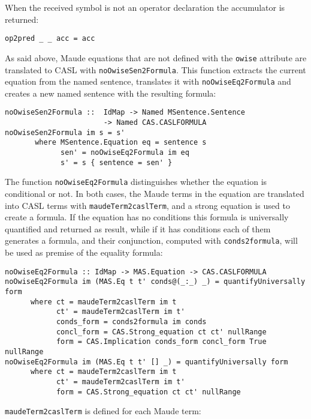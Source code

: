 When the received symbol is not an operator declaration the accumulator
is returned:

{\codesize
\begin{verbatim}
op2pred _ _ acc = acc
\end{verbatim}
}

As said above, Maude equations that are not defined with the \verb"owise"
attribute are translated to CASL with \verb"noOwiseSen2Formula". This
function extracts the current equation from the named sentence, translates
it with \verb"noOwiseEq2Formula" and creates a new named sentence
with the resulting formula:

{\codesize
\begin{verbatim}
noOwiseSen2Formula ::  IdMap -> Named MSentence.Sentence
                       -> Named CAS.CASLFORMULA
noOwiseSen2Formula im s = s'
       where MSentence.Equation eq = sentence s
             sen' = noOwiseEq2Formula im eq
             s' = s { sentence = sen' }
\end{verbatim}
}

The function \verb"noOwiseEq2Formula" distinguishes whether the equation
is conditional or not. In both cases, the Maude terms in the equation
are translated into CASL terms with \verb"maudeTerm2caslTerm", and a
strong equation is used to create a formula. If the equation has no
conditions this formula is universally quantified and returned as result,
while if it has conditions each of them generates a formula, and their
conjunction, computed with \verb"conds2formula", will be used as premise
of the equality formula:

{\codesize
\begin{verbatim}
noOwiseEq2Formula :: IdMap -> MAS.Equation -> CAS.CASLFORMULA
noOwiseEq2Formula im (MAS.Eq t t' conds@(_:_) _) = quantifyUniversally form
      where ct = maudeTerm2caslTerm im t
            ct' = maudeTerm2caslTerm im t'
            conds_form = conds2formula im conds
            concl_form = CAS.Strong_equation ct ct' nullRange
            form = CAS.Implication conds_form concl_form True nullRange
noOwiseEq2Formula im (MAS.Eq t t' [] _) = quantifyUniversally form
      where ct = maudeTerm2caslTerm im t
            ct' = maudeTerm2caslTerm im t'
            form = CAS.Strong_equation ct ct' nullRange
\end{verbatim}
}

\verb"maudeTerm2caslTerm" is defined for each Maude term:

